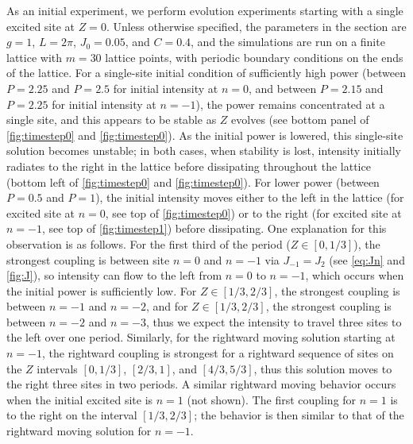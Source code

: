 \documentclass[reprint, amsmath,amssymb,aps,pre]{revtex4-2}
\begin{document}
As an initial experiment, we perform evolution experiments starting with a single excited site at $Z=0$. Unless otherwise specified, the parameters in the section are $g=1$, $L=2\pi$, $J_0 = 0.05$, and $C=0.4$, and the simulations are run on a finite lattice with $m=30$ lattice points, with periodic boundary conditions on the ends of the lattice. For a single-site initial condition of sufficiently high power (between $P=2.25$ and $P=2.5$ for initial intensity at $n=0$, and between $P=2.15$ and $P=2.25$ for initial intensity at $n=-1$), the power remains concentrated at a single site, and this appears to be stable as $Z$ evolves (see bottom panel of \cref{fig:timestep0} and \cref{fig:timestep0}). As the initial power is lowered, this single-site solution becomes unstable; in both cases, when stability is lost, intensity initially radiates to the right in the lattice before dissipating throughout the lattice (bottom left of \cref{fig:timestep0} and \cref{fig:timestep0}). For lower power (between $P=0.5$ and $P=1$), the initial intensity moves either to the left in the lattice (for excited site at $n=0$, see top of \cref{fig:timestep0}) or to the right (for excited site at $n=-1$, see top of \cref{fig:timestep1}) before dissipating. One explanation for this observation is as follows. For the first third of the period ($Z \in [0,1/3]$), the strongest coupling is between site $n=0$ and $n=-1$ via $J_{-1} = J_2$ (see \cref{eq:Jn} and \cref{fig:J}), so intensity can flow to the left from $n=0$ to $n=-1$, which occurs when the initial power is sufficiently low. For $Z \in [1/3,2/3]$, the strongest coupling is between $n=-1$ and $n=-2$, and for $Z \in [1/3,2/3]$, the strongest coupling is between $n=-2$ and $n=-3$, thus we expect the intensity to travel three sites to the left over one period. Similarly, for the rightward moving solution starting at $n=-1$, the rightward coupling is strongest for a rightward sequence of sites on the $Z$ intervals $[0,1/3]$, $[2/3,1]$, and $[4/3,5/3]$, thus this solution moves to the right three sites in two periods. A similar rightward moving behavior occurs when the initial excited site is $n=1$ (not shown). The first coupling for $n=1$ is to the right on the interval $[1/3, 2/3]$; the behavior is then similar to that of the rightward moving solution for $n=-1$. 
\end{document}
